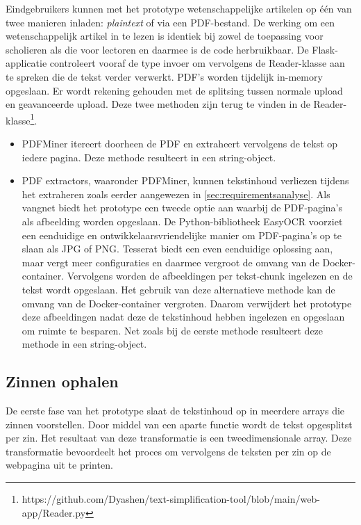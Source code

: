 Eindgebruikers kunnen met het prototype wetenschappelijke artikelen op één van twee manieren inladen: \textit{plaintext} of via een PDF-bestand. De werking om een wetenschappelijk artikel in te lezen is identiek bij zowel de toepassing voor scholieren als die voor lectoren en daarmee is de code herbruikbaar. De Flask-applicatie controleert vooraf de type invoer om vervolgens de Reader-klasse aan te spreken die de tekst verder verwerkt. PDF's worden tijdelijk in-memory opgeslaan. Er wordt rekening gehouden met de splitsing tussen normale upload en geavanceerde upload. Deze twee methoden zijn terug te vinden in de Reader-klasse\footnote{https://github.com/Dyashen/text-simplification-tool/blob/main/web-app/Reader.py}.

\begin{itemize}
	\item PDFMiner itereert doorheen de PDF en extraheert vervolgens de tekst op iedere pagina. Deze methode resulteert in een string-object.
	\item PDF extractors, waaronder PDFMiner, kunnen tekstinhoud verliezen tijdens het extraheren zoals eerder aangewezen in \ref{sec:requirementsanalyse}. Als vangnet biedt het prototype een tweede optie aan waarbij de PDF-pagina's als afbeelding worden opgeslaan. De Python-bibliotheek EasyOCR voorziet een eenduidige en ontwikkelaarsvriendelijke manier om PDF-pagina's op te slaan als JPG of PNG. Tesserat biedt een even eenduidige oplossing aan, maar vergt meer configuraties en daarmee vergroot de omvang van de Docker-container. Vervolgens worden de afbeeldingen per tekst-chunk ingelezen en de tekst wordt opgeslaan. Het gebruik van deze alternatieve methode kan de omvang van de Docker-container vergroten. Daarom verwijdert het prototype deze afbeeldingen nadat deze de tekstinhoud hebben ingelezen en opgeslaan om ruimte te besparen. Net zoals bij de eerste methode resulteert deze methode in een string-object.
\end{itemize}


\subsection{Zinnen ophalen}

De eerste fase van het prototype slaat de tekstinhoud op in meerdere arrays die zinnen voorstellen. Door middel van een aparte functie wordt de tekst opgesplitst per zin. Het resultaat van deze transformatie is een tweedimensionale array. Deze transformatie bevoordeelt het proces om vervolgens de teksten per zin op de webpagina uit te printen. 

